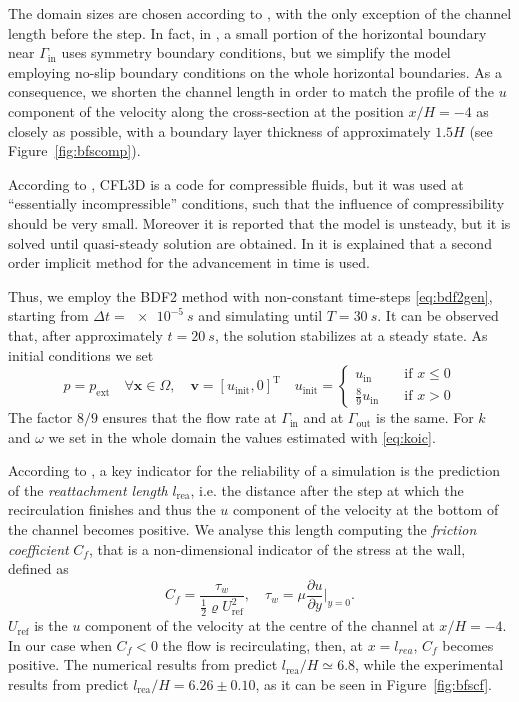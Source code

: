 The domain sizes are chosen according to \cite{web:nasa}, with the only 
exception of the channel length before the step. In fact, in \cite{web:nasa}, a 
small portion of the horizontal boundary near $\Gamma_\text{in}$ uses symmetry 
boundary conditions, but we simplify the model employing no-slip boundary 
conditions on the whole horizontal boundaries. As a consequence, we shorten the 
channel length in order to match the profile of the $u$ 
component of the velocity along the cross-section at the position $x/H=-4$ as closely as possible, 
with a boundary layer thickness of approximately $1.5H$ (see 
Figure~\ref{fig:bfscomp}).

According to \cite{web:nasa}, CFL3D is a code for compressible fluids, but it was used at ``essentially incompressible'' conditions, such that the influence of compressibility should be very small. Moreover it is reported that
the model is unsteady, but it is solved until quasi-steady solution are obtained.
In \cite{bfs:cfl3d} it is explained that a second order implicit method for the advancement in time is used.

Thus, we employ the BDF2 method with non-constant time-steps \eqref{eq:bdf2gen}, starting from $\Delta t = \SI{e-5}{s}$ and simulating until $T = \SI{30}{s}$. It can be observed that, after approximately $t=\SI{20}{s}$, the solution stabilizes at a steady state. As initial conditions we set
\begin{equation}
p=p_\text{ext} \quad \forall \mathbf{x} \in \Omega, \quad \mathbf{v} = [u_\text{init},0]^\mathrm{T} \quad u_\text{init} = \begin{cases}
u_\text{in} \quad&\text{if $x\leq 0$}\\
\frac{8}{9}u_\text{in} \quad&\text{if $x>0$}
\end{cases}
\end{equation}
The factor $8/9$ ensures that the flow rate at $\Gamma_\text{in}$ and at $\Gamma_\text{out}$ is the same. For $k$ and $\omega$ we set in the whole domain the values estimated with \eqref{eq:koic}.

According to \cite{web:nasa}, a key indicator for the reliability of a 
simulation is the prediction of the \emph{reattachment length} $l_\text{rea}$, 
i.e. the distance after the step at which the recirculation finishes and thus 
the $u$ component of the velocity at the bottom of the channel becomes 
positive. We analyse this length computing the \emph{friction coefficient} 
$C_f$, that is a non-dimensional indicator of the stress at the wall, defined as
\begin{equation}
C_f = \frac{\tau_w}{\frac{1}{2}\varrho U_\text{ref}^2}, \quad \tau_w = \mu \frac{\partial u}{\partial y} \Big|_{y=0}.
\end{equation}
$U_\text{ref}$ is the $u$ component of the velocity at the centre of the channel at $x/H=-4$. In our case when $C_f<0$ the flow is recirculating, then, at $x=l_{rea}$, $C_f$ becomes positive. The numerical results from \cite{web:nasa} predict $l_\text{rea}/H \simeq 6.8$, while the experimental results from \cite{bfs:driver} predict $l_\text{rea}/H = 6.26 \pm 0.10$, as it can be seen in Figure~\ref{fig:bfscf}.


